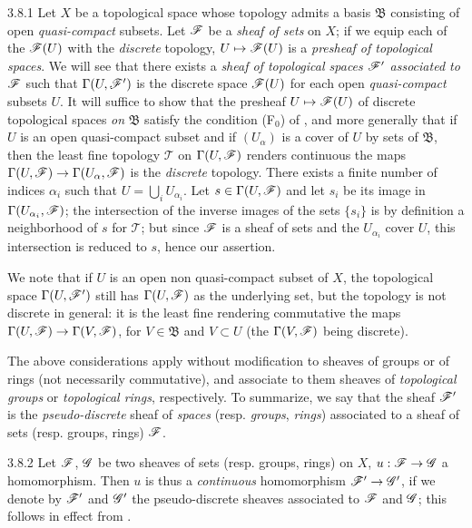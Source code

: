 \begin{env}{3.8.1}
\label{env-0.3.8.1}
Let $X$ be a topological space whose topology admits a basis $\mathfrak{B}$ consisting of
open \emph{quasi-compact} subsets. Let $\mathscr{F}$ be a \emph{sheaf of sets} on $X$; if we equip
each of the $\mathscr{F}(U)$ with the \emph{discrete} topology, $U\mapsto\mathscr{F}(U)$ is a
\emph{presheaf of topological spaces}. We will see that there exists a \emph{sheaf of
topological spaces $\mathscr{F}'$ associated to $\mathscr{F}$}  such that
$\Gamma(U,\mathscr{F}')$ is the discrete space $\mathscr{F}(U)$ for each open \emph{quasi-compact}
subsets $U$. It will suffice to show that the presheaf $U\mapsto\mathscr{F}(U)$ of discrete
topological spaces \emph{on} $\mathfrak{B}$ satisfy the condition (F$_0$) of
, and more generally that if $U$ is an open quasi-compact subset and if
$(U_\alpha)$ is a cover of $U$ by sets of $\mathfrak{B}$, then the least fine topology
$\mathscr{T}$ on $\Gamma(U,\mathscr{F})$ renders continuous the maps
$\Gamma(U,\mathscr{F})\to\Gamma(U_\alpha,\mathscr{F})$ is the \emph{discrete} topology. There exists
a finite number of indices $\alpha_i$ such that $U=\bigcup_i U_{\alpha_i}$.
Let $s\in\Gamma(U,\mathscr{F})$ and let $s_i$ be its image in $\Gamma(U_{\alpha_i},\mathscr{F})$;
the intersection of the inverse images of the sets $\{s_i\}$ is by definition a neighborhood
of $s$ for $\mathscr{T}$; but since $\mathscr{F}$ is a sheaf of sets and the $U_{\alpha_i}$ cover
$U$, this intersection is reduced to $s$, hence our assertion.

We note that if $U$ is an open non quasi-compact subset of $X$, the topological space
$\Gamma(U,\mathscr{F}')$ still has $\Gamma(U,\mathscr{F})$ as the underlying set, but the topology is
not discrete in general: it is the least fine rendering commutative the maps
$\Gamma(U,\mathscr{F})\to\Gamma(V,\mathscr{F})$, for $V\in\mathfrak{B}$ and $V\subset U$ (the
$\Gamma(V,\mathscr{F})$ being discrete).

The above considerations apply without modification to sheaves of groups or of rings (not
necessarily commutative), and associate to them sheaves of \emph{topological
groups} or \emph{topological rings}, respectively. To summarize, we say that the sheaf
$\mathscr{F}'$ is the \emph{pseudo-discrete} sheaf of \emph{spaces} (resp. \emph{groups},
\emph{rings}) associated to a sheaf of sets (resp. groups, rings) $\mathscr{F}$.
\end{env}

\begin{env}{3.8.2}
\label{env-0.3.8.2}
Let $\mathscr{F}$, $\mathscr{G}$ be two sheaves of sets (resp. groups, rings) on $X$,
$u:\mathscr{F}\to\mathscr{G}$ a homomorphism. Then $u$ is thus a \emph{continuous} homomorphism
$\mathscr{F}'\to\mathscr{G}'$, if we denote by $\mathscr{F}'$ and $\mathscr{G}'$ the pseudo-discrete sheaves
associated to $\mathscr{F}$ and $\mathscr{G}$; this follows in effect from .
\end{env}

